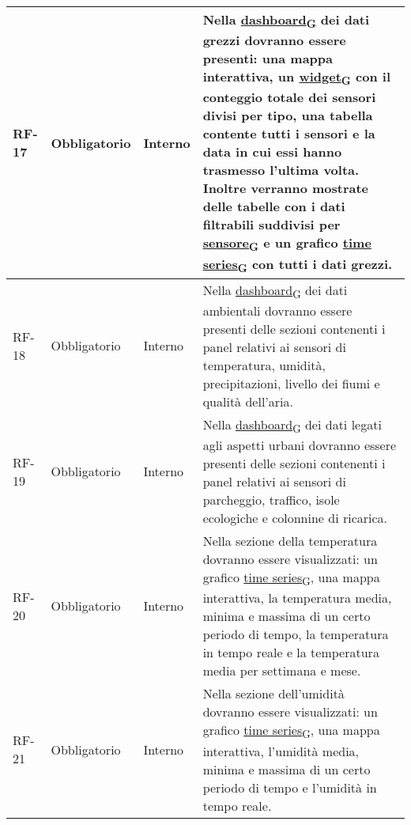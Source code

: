 \begin{longtable}{|>{\centering\arraybackslash}m{}|>{\centering\arraybackslash}m{}|>{\centering\arraybackslash}m{}|>{\centering\arraybackslash}m{}|}
	RF-17           & Obbligatorio        & Interno                                                                                                           & Nella \href{https://7last.github.io/docs/pb/documentazione-interna/glossario\#dashboard}{dashboard\textsubscript{G}} dei dati grezzi dovranno essere presenti: una mappa interattiva, un \href{https://7last.github.io/docs/pb/documentazione-interna/glossario\#widget}{widget\textsubscript{G}} con il conteggio totale dei sensori divisi per tipo, una tabella contente tutti i sensori e la data in cui essi hanno trasmesso l'ultima volta. Inoltre verranno mostrate delle tabelle con i dati filtrabili suddivisi per \href{https://7last.github.io/docs/pb/documentazione-interna/glossario\#sensore}{sensore\textsubscript{G}} e un grafico \href{https://7last.github.io/docs/pb/documentazione-interna/glossario\#time-series}{time series\textsubscript{G}} con tutti i dati grezzi.
	\\\hline
	RF-18           & Obbligatorio        & Interno                                                                                                           & Nella \href{https://7last.github.io/docs/pb/documentazione-interna/glossario\#dashboard}{dashboard\textsubscript{G}} dei dati ambientali dovranno essere presenti delle sezioni contenenti i panel relativi ai sensori di temperatura, umidità, precipitazioni, livello dei fiumi e qualità dell'aria.
	\\\hline
	RF-19           & Obbligatorio        & Interno                                                                                                           & Nella \href{https://7last.github.io/docs/pb/documentazione-interna/glossario\#dashboard}{dashboard\textsubscript{G}} dei dati legati agli aspetti urbani dovranno essere presenti delle sezioni contenenti i panel relativi ai sensori di parcheggio, traffico, isole ecologiche e colonnine di ricarica.
	\\\hline
	RF-20           & Obbligatorio        & Interno                                                                                                           & Nella sezione della temperatura dovranno essere visualizzati: un grafico \href{https://7last.github.io/docs/pb/documentazione-interna/glossario\#time-series}{time series\textsubscript{G}}, una mappa interattiva, la temperatura media, minima e massima di un certo periodo di tempo, la temperatura in tempo reale e la temperatura media per settimana e mese.
	\\\hline
	RF-21           & Obbligatorio        & Interno                                                                                                           & Nella sezione dell'umidità dovranno essere visualizzati: un grafico \href{https://7last.github.io/docs/pb/documentazione-interna/glossario\#time-series}{time series\textsubscript{G}}, una mappa interattiva, l'umidità media, minima e massima di un certo periodo di tempo e l'umidità in tempo reale.

\end{longtable}
